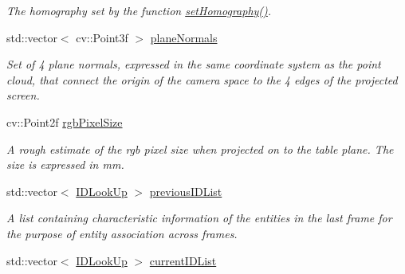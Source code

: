 \begin{DoxyCompactItemize}
\begin{DoxyCompactList}\small\item\em The homography set by the function \hyperlink{classpersonal_robotics_1_1_object_segmentor_a44bbf97572b59f392b73fff1fafccc24}{set\+Homography()}. \end{DoxyCompactList}\item 
std\+::vector$<$ cv\+::\+Point3f $>$ \hyperlink{classpersonal_robotics_1_1_object_segmentor_a2d9b43c69441221cd4b03b61da1ba1ae}{plane\+Normals}
\begin{DoxyCompactList}\small\item\em Set of 4 plane normals, expressed in the same coordinate system as the point cloud, that connect the origin of the camera space to the 4 edges of the projected screen. \end{DoxyCompactList}\item 
\hypertarget{classpersonal_robotics_1_1_object_segmentor_a7ba1dca4b7433b87ed9028227d0929b3}{}cv\+::\+Point2f \hyperlink{classpersonal_robotics_1_1_object_segmentor_a7ba1dca4b7433b87ed9028227d0929b3}{rgb\+Pixel\+Size}\label{classpersonal_robotics_1_1_object_segmentor_a7ba1dca4b7433b87ed9028227d0929b3}

\begin{DoxyCompactList}\small\item\em A rough estimate of the rgb pixel size when projected on to the table plane. The size is expressed in mm. \end{DoxyCompactList}\item 
\hypertarget{classpersonal_robotics_1_1_object_segmentor_a11e5491339e7f1b543835f10a5daef46}{}std\+::vector$<$ \hyperlink{structpersonal_robotics_1_1_i_d_look_up}{I\+D\+Look\+Up} $>$ \hyperlink{classpersonal_robotics_1_1_object_segmentor_a11e5491339e7f1b543835f10a5daef46}{previous\+I\+D\+List}\label{classpersonal_robotics_1_1_object_segmentor_a11e5491339e7f1b543835f10a5daef46}

\begin{DoxyCompactList}\small\item\em A list containing characteristic information of the entities in the last frame for the purpose of entity association across frames. \end{DoxyCompactList}\item 
\hypertarget{classpersonal_robotics_1_1_object_segmentor_aee37376bccaeae9e6b36da2faaa9eff0}{}std\+::vector$<$ \hyperlink{structpersonal_robotics_1_1_i_d_look_up}{I\+D\+Look\+Up} $>$ \hyperlink{classpersonal_robotics_1_1_object_segmentor_aee37376bccaeae9e6b36da2faaa9eff0}{current\+I\+D\+List}\label{classpersonal_robotics_1_1_object_segmentor_aee37376bccaeae9e6b36da2faaa9eff0}


\end{DoxyCompactItemize}
